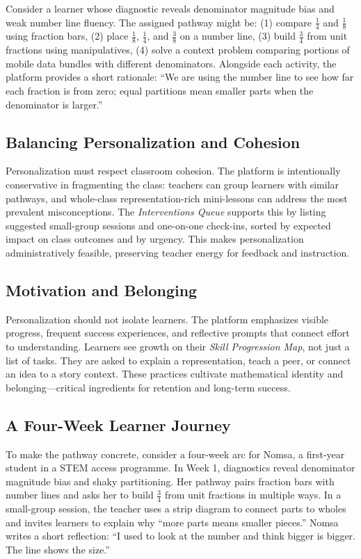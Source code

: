 Consider a learner whose diagnostic reveals denominator magnitude bias and weak number line fluency. The assigned pathway might be: (1) compare $\tfrac{1}{4}$ and $\tfrac{1}{8}$ using fraction bars, (2) place $\tfrac{1}{8}$, $\tfrac{1}{4}$, and $\tfrac{3}{8}$ on a number line, (3) build $\tfrac{3}{4}$ from unit fractions using manipulatives, (4) solve a context problem comparing portions of mobile data bundles with different denominators. Alongside each activity, the platform provides a short rationale: ``We are using the number line to see how far each fraction is from zero; equal partitions mean smaller parts when the denominator is larger.''

\subsection{Balancing Personalization and Cohesion}

Personalization must respect classroom cohesion. The platform is intentionally conservative in fragmenting the class: teachers can group learners with similar pathways, and whole-class representation-rich mini-lessons can address the most prevalent misconceptions. The \emph{Interventions Queue} supports this by listing suggested small-group sessions and one-on-one check-ins, sorted by expected impact on class outcomes and by urgency. This makes personalization administratively feasible, preserving teacher energy for feedback and instruction.

\subsection{Motivation and Belonging}

Personalization should not isolate learners. The platform emphasizes visible progress, frequent success experiences, and reflective prompts that connect effort to understanding. Learners see growth on their \emph{Skill Progression Map}, not just a list of tasks. They are asked to explain a representation, teach a peer, or connect an idea to a story context. These practices cultivate mathematical identity and belonging---critical ingredients for retention and long-term success.

\subsection{A Four-Week Learner Journey}

To make the pathway concrete, consider a four-week arc for Nomsa, a first-year student in a STEM access programme. In Week 1, diagnostics reveal denominator magnitude bias and shaky partitioning. Her pathway pairs fraction bars with number lines and asks her to build $\tfrac{3}{4}$ from unit fractions in multiple ways. In a small-group session, the teacher uses a strip diagram to connect parts to wholes and invites learners to explain why ``more parts means smaller pieces.'' Nomsa writes a short reflection: ``I used to look at the number and think bigger is bigger. The line shows the size.''

